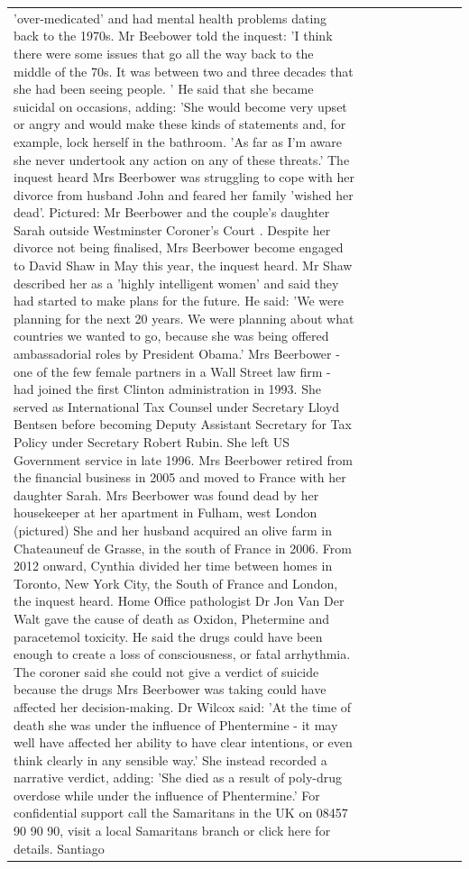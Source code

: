 \begin{table}[H]
\begin{tabular}{lllrlllll}
'over-medicated' and had mental health problems dating back to the 1970s. Mr Beebower told the inquest: 'I think there were some issues that go all the way back to the middle of the 70s. It was between two and three decades that she had been seeing people. ' He said that she became suicidal on occasions, adding: 'She would become very upset or angry and would make these kinds of statements and, for example, lock herself in the bathroom. 'As far as I'm aware she never undertook any action on any of these threats.' The inquest heard Mrs Beerbower was struggling to cope with her divorce from husband John and feared her family 'wished her dead'. Pictured: Mr Beerbower and the couple's daughter Sarah outside Westminster Coroner's Court . Despite her divorce not being finalised, Mrs Beerbower become engaged to David Shaw in May this year, the inquest heard. Mr Shaw described her as a 'highly intelligent women' and said they had started to make plans for the future. He said: 'We were planning for the next 20 years. We were planning about what countries we wanted to go, because she was being offered ambassadorial roles by President Obama.' Mrs Beerbower - one of the few female partners in a Wall Street law firm - had joined the first Clinton administration in 1993. She served as International Tax Counsel under Secretary Lloyd Bentsen before becoming Deputy Assistant Secretary for Tax Policy under Secretary Robert Rubin. She left US Government service in late 1996. Mrs Beerbower retired from the financial business in 2005 and moved to France with her daughter Sarah. Mrs Beerbower was found dead by her housekeeper at her apartment in Fulham, west London (pictured) She and her husband acquired an olive farm in Chateauneuf de Grasse, in the south of France in 2006. From 2012 onward, Cynthia divided her time between homes in Toronto, New York City, the South of France and London, the inquest heard. Home Office pathologist Dr Jon Van Der Walt gave the cause of death as Oxidon, Phetermine and paracetemol toxicity. He said the drugs could have been enough to create a loss of consciousness, or fatal arrhythmia. The coroner said she could not give a verdict of suicide because the drugs Mrs Beerbower was taking could have affected her decision-making. Dr Wilcox said: 'At the time of death she was under the influence of Phentermine - it may well have affected her ability to have clear intentions, or even think clearly in any sensible way.' She instead recorded a narrative verdict, adding: 'She died as a result of poly-drug overdose while under the influence of Phentermine.' For confidential support call the Samaritans in the UK on 08457 90 90 90, visit a local Samaritans branch or click here for details. Santiago \\

\end{tabular}
\end{table}
